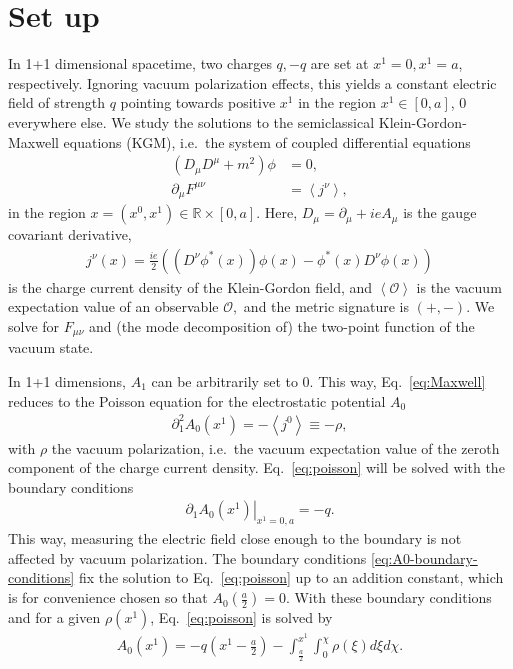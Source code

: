 \section{Set up} 

In 1+1 dimensional spacetime, two charges $q, -q$
are set at $x^1=0, x^{1}=a$, respectively. Ignoring vacuum polarization effects,
this yields a constant electric field of strength $q$ pointing towards positive $x^{1}$ in the region $x^1\in[0, a]$, 0 everywhere else.
We study the solutions to the semiclassical Klein-Gordon-Maxwell equations (KGM), i.e.~the system of coupled differential equations
\begin{subequations}
    \begin{align}
        \left( D_\mu D^\mu + m^2 \right)\phi &= 0, 
        \label{eq:KG}\\
        \partial_\mu F^{\mu\nu} &= \left< j^\nu \right>,
        \label{eq:Maxwell}
    \end{align}
\end{subequations} in the region $x=(x^0, x^1) \in     \mathbb{R} \times [0,
a]$. Here, $D_\mu = \partial_\mu +ie A_\mu$ is the gauge covariant
derivative, \begin{align}
    j^\nu(x) = \frac{ie}{2} \left((D^\nu \phi^*(x)) \phi (x)- \phi^*(x)
    D^\nu \phi(x) \right)
    \label{eq:charge-current-density}
\end{align}
is the charge current density of the Klein-Gordon field, and
$\left< \mathcal{O}\right>$ is the vacuum expectation value of an observable $\mathcal{O},$ and the metric signature
is $(+,-)$.
We solve for $F_{\mu\nu}$ and (the mode decomposition of) the two-point function of the vacuum state.

In 1+1 dimensions, $A_1$ can be arbitrarily set to 0. This way, Eq.~\eqref{eq:Maxwell} reduces to the Poisson equation for the electrostatic potential $A_0$
\begin{align}
    \partial_1^2 A_0(x^1) = -\left< j^0 \right> \equiv -\rho, \label{eq:poisson}
\end{align} 
with $\rho$ the vacuum polarization, i.e.~the vacuum expectation value of the zeroth component of the charge current density.
Eq.~\eqref{eq:poisson} will be solved with the boundary conditions
\begin{align}
    \left. \partial_1
        A_0(x^1)\right|_{x^1=0, a} =  -q.
        \label{eq:A0-boundary-conditions}
\end{align}
This way, measuring the electric field close enough to the boundary is not affected by vacuum polarization.
The boundary conditions \eqref{eq:A0-boundary-conditions} fix the solution to Eq.~\eqref{eq:poisson} up to an addition constant,
which is for convenience chosen so that $A_0(\frac{a}{2}) = 0$. With these boundary conditions and for a given $\rho(x^1)$, Eq.~\eqref{eq:poisson} is solved by
\begin{align}
        A_0(x^1) = -q\left(x^1 - \frac{a}{2} \right) -
        \int_{\frac{a}{2}}^{x^{1}} \int_{0}^{\chi} \rho(\xi) d \xi d \chi.
    \label{eq:A0-general} 
\end{align}


